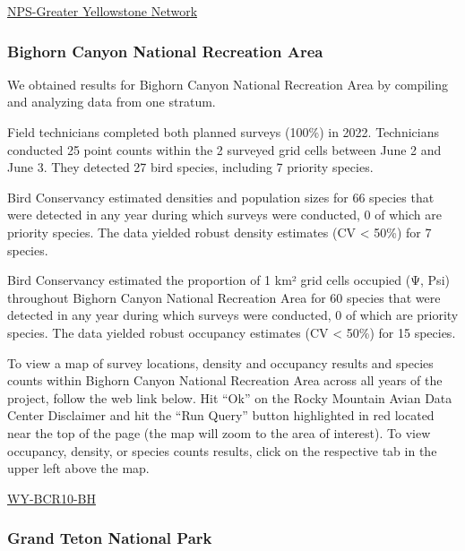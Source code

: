 \documentclass[
  letterpaper,
  DIV=11,
  numbers=noendperiod,
  oneside]{scrreprt}
\begin{document}
\href{http://www.rmbo.org/new_site/adc/QueryWindow.aspx\#N4IgzgrgDgpgTmALnAhoiBbEAuABCAOQAUBlAWgHE4Y15cBNGAGyYHsB3JVgOxlwJiJ2rOAGsQAXyA==}{NPS-Greater
Yellowstone Network}

\hypertarget{bighorn-canyon-national-recreation-area}{%
\subsubsection{Bighorn Canyon National Recreation
Area}\label{bighorn-canyon-national-recreation-area}}

We obtained results for Bighorn Canyon National Recreation Area by
compiling and analyzing data from one stratum.

Field technicians completed both planned surveys (100\%) in 2022.
Technicians conducted 25 point counts within the 2 surveyed grid cells
between June 2 and June 3. They detected 27 bird species, including 7
priority species.

Bird Conservancy estimated densities and population sizes for 66 species
that were detected in any year during which surveys were conducted, 0 of
which are priority species. The data yielded robust density estimates
(CV \textless{} 50\%) for 7 species.

Bird Conservancy estimated the proportion of 1 km² grid cells occupied
(Ψ, Psi) throughout Bighorn Canyon National Recreation Area for 60
species that were detected in any year during which surveys were
conducted, 0 of which are priority species. The data yielded robust
occupancy estimates (CV \textless{} 50\%) for 15 species.

To view a map of survey locations, density and occupancy results and
species counts within Bighorn Canyon National Recreation Area across all
years of the project, follow the web link below. Hit ``Ok'' on the Rocky
Mountain Avian Data Center Disclaimer and hit the ``Run Query'' button
highlighted in red located near the top of the page (the map will zoom
to the area of interest). To view occupancy, density, or species counts
results, click on the respective tab in the upper left above the map.

\href{http://www.rmbo.org/new_site/adc/QueryWindow.aspx\#N4IgzgLgTghhCuBbEAuABCA6gTQLQCEBhAJQEYAGAgCXXwEsBzACwHsoA7NQmdgTxc4A5OHQEwANmmIBTAMZRpIgWgCCCmCAC+QA}{WY-BCR10-BH}

\hypertarget{grand-teton-national-park}{%
\subsubsection{Grand Teton National
Park}\label{grand-teton-national-park}}
\end{document}
